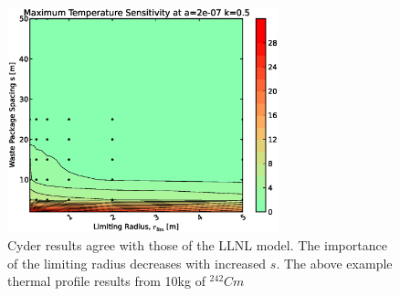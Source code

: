 \begin{figure}[htbp!]
\begin{center}
\includegraphics[width=0.7\textwidth]{./chapters/demonstration/spacing/rs.eps}
\end{center}
\caption[Thermal Sensitivity to $s$ and $r_{lim}$ Sensitivity in \Cyder]
{Cyder results agree with those of the LLNL model. The importance of the 
limiting radius decreases with increased $s$. The above example thermal 
profile results from 10kg of $^{242}Cm$}
\label{fig:rs}
\end{figure}

